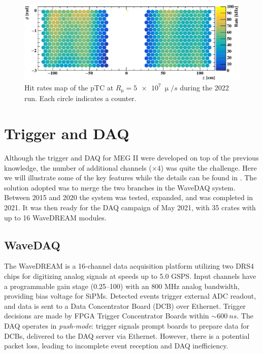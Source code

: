 \begin{refsection}
        \begin{figure}
            \centering
            \includegraphics[width = \textwidth]{Figures/MEG/pTC_rate.png}
            \caption{Hit rates map of the pTC at $R_\upmu = \SI{5e7}{\upmu \per s}$ during the 2022 run. Each circle indicates a counter.}
            \label{fig:MEGII:pTC:rate}
        \end{figure}

\section{Trigger and DAQ}
    Although the trigger and DAQ for MEG II were developed on top of the previous knowledge, the number of additional channels ($\times4$) was quite the challenge. 
    Here we will illustrate some of the key features while the details can be found in \cite{Galli2014JINST}.
    The solution adopted was to merge the two branches in the WaveDAQ system.
    Between 2015 and 2020 the system was tested, expanded, and was completed in 2021.
    It was then ready for the DAQ campaign of May 2021, with 35 crates with up to 16 WaveDREAM modules.

    \subsection{WaveDAQ}
    The WaveDREAM is a 16-channel data acquisition platform utilizing two DRS4 chips for digitizing analog signals at speeds up to 5.0 GSPS.
    Input channels have a programmable gain stage (0.25–100) with an 800 MHz analog bandwidth, providing bias voltage for SiPMs. 
    Detected events trigger external ADC readout, and data is sent to a Data Concentrator Board (DCB) over Ethernet. 
    Trigger decisions are made by FPGA Trigger Concentrator Boards within $\sim\SI{600}{ns}$.
    The DAQ operates in \textit{push-mode}: trigger signals prompt boards to prepare data for DCBs, delivered to the DAQ server via Ethernet. However, there is a potential packet loss, leading to incomplete event reception and DAQ inefficiency. 
    

\end{refsection}
